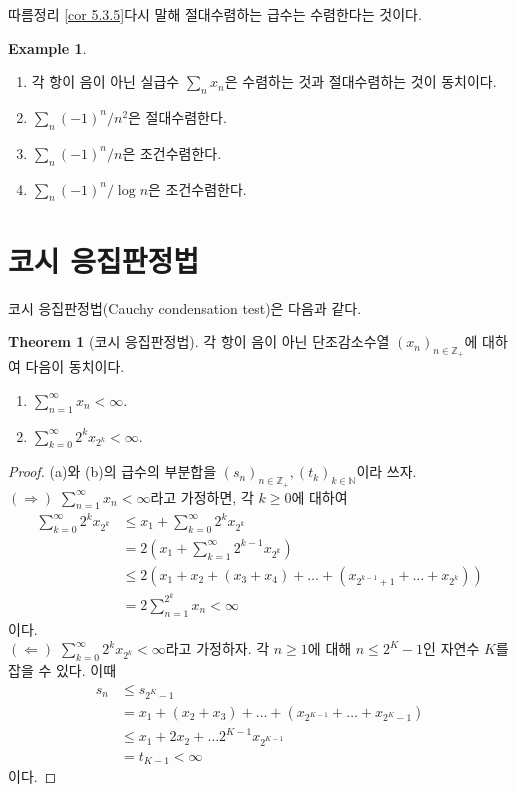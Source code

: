 \documentclass[11pt]{book}
\numberwithin{equation}{chapter}
\def\NN{\mathbb{N}}
\def\ZZ{\mathbb{Z}}
\newcommand{\paren}[1]{\left(#1\right)}
\theoremstyle{definition}
\newtheorem{thm}{Theorem}[section]
\newtheorem*{ex}{Example}
\newenvironment{enum}
	{\begin{enumerate}[label=(\alph*), leftmargin=2\parindent]}
	{\end{enumerate}}
\begin{document}
따름정리 \ref{cor 5.3.5}\는 다시 말해 절대수렴하는 급수는 수렴한다는 것이다.

\begin{ex}
    \quad

    \begin{enum}
        \item 각 항이 음이 아닌 실급수 \(\sum_n x_n\)은 수렴하는 것과 절대수렴하는 것이 동치이다.
        \item \(\sum_n (-1)^n / n^2\)은 절대수렴한다.
        \item \(\sum_n (-1)^n / n\)은 조건수렴한다.
        \item \(\sum_n (-1)^n / \log n\)은 조건수렴한다.
    \end{enum}
\end{ex}

\section{코시 응집판정법}

코시 응집판정법(Cauchy condensation test)은 다음과 같다.

\begin{thm} [코시 응집판정법]
    각 항이 음이 아닌 단조감소수열 \((x_n)_{n \in \ZZ_+}\)에 대하여 다음이 동치이다.
    \begin{enum}
        \item \(\sum_{n=1}^\infty x_n < \infty\).
        \item \(\sum_{k=0}^\infty 2^k x_{2^k} < \infty\).
    \end{enum}
\end{thm}
\begin{proof}
    (a)와 (b)의 급수의 부분합을 \((s_n)_{n \in \ZZ_+}, (t_k)_{k \in \NN}\)이라 쓰자.\\
    \((\Rightarrow)\) \(\sum_{n=1}^\infty x_n < \infty\)라고 가정하면, 각 \(k \ge 0\)에 대하여
    \begin{align*}
        \sum_{k=0}^\infty 2^k x_{2^k} &\le x_1 + \sum_{k=0}^\infty 2^k x_{2^k}\\
        &= 2 \paren{x_1 + \sum_{k=1}^\infty 2^{k-1} x_{2^k}}\\
        &\le 2 (x_1 + x_2 + (x_3 + x_4) + \ldots + (x_{2^{k-1}+1} + \ldots + x_{2^k}))\\
        &= 2 \sum_{n=1}^{2^k} x_n < \infty
    \end{align*}
    이다.\\
    \((\Leftarrow)\) \(\sum_{k=0}^\infty 2^k x_{2^k} < \infty\)라고 가정하자. 각 \(n \ge 1\)에 대해 \(n \le 2^K - 1\)인 자연수 \(K\)를 잡을 수 있다. 이때
    \begin{align*}
        s_n &\le s_{2^K - 1}\\
        &= x_1 + (x_2 + x_3) + \ldots + (x_{2^{K-1}} + \ldots + x_{2^K - 1})\\
        &\le x_1 + 2x_2 + \ldots 2^{K-1}x_{2^{K-1}}\\
        &= t_{K-1} < \infty
    \end{align*}
    이다.
\end{proof}
\end{document}
